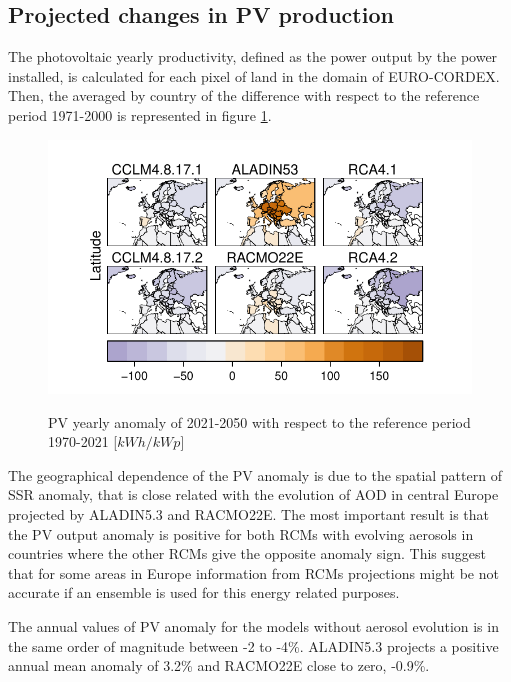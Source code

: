 \subsection{Projected changes in PV production}

The photovoltaic yearly productivity, defined as the power output by the power installed, is calculated for each pixel of land in the domain of EURO-CORDEX. Then, the averaged by country of the difference with respect to the reference period 1971-2000 is represented in figure \ref{fig:pvcountry}.


\begin{figure}[h!]
    \includegraphics[width=1\textwidth]{figs/capitulo7/bycountrytodos.pdf}
    \label{fig:pvcountry}
  \caption{PV yearly anomaly of 2021-2050 with respect to the reference period 1970-2021 [$kWh/kWp$]}
\end{figure}

The geographical dependence of the PV anomaly is due to the spatial pattern of SSR anomaly, that is close related with the evolution of AOD in central Europe projected by ALADIN5.3 and RACMO22E. The most important result is that the PV output anomaly is positive for both RCMs with evolving aerosols in countries where the other RCMs give the opposite anomaly sign. This suggest that for some areas in Europe information from RCMs projections might be not accurate if an ensemble is used for this energy related purposes.

The annual values of PV anomaly for the models without aerosol evolution is in the same order of magnitude between -2 to -4\%. ALADIN5.3 projects a positive annual mean anomaly of 3.2\% and RACMO22E close to zero, -0.9\%.

